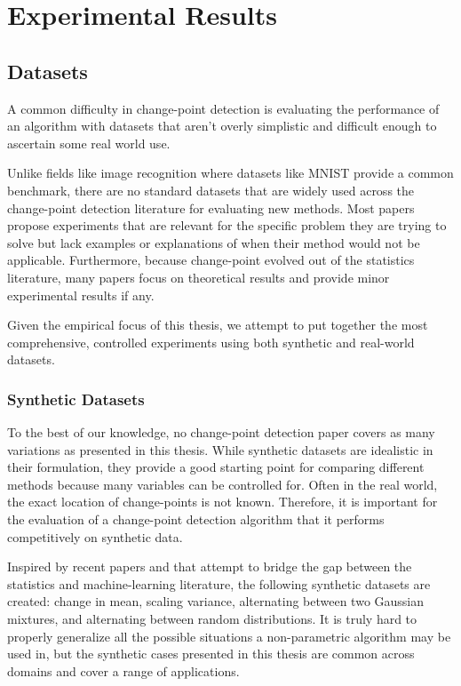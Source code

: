 \chapter{Experimental Results}
\section{Datasets}
A common difficulty in change-point detection is evaluating the performance of an algorithm with datasets that aren't overly simplistic and difficult enough to ascertain some real world use.

Unlike fields like image recognition where datasets like MNIST provide a common benchmark, there are no standard datasets that are widely used across the change-point detection literature for evaluating new methods. Most papers propose experiments that are relevant for the specific problem they are trying to solve  but lack examples or explanations of when their method would not be applicable.  Furthermore, because change-point evolved out of the statistics literature, many papers focus on theoretical results and provide minor experimental results if any.

Given the empirical focus of this thesis, we attempt to put together the most comprehensive, controlled experiments using both synthetic and real-world datasets.
\subsection{Synthetic Datasets}
To the best of our knowledge, no change-point detection paper covers as many variations as presented in this thesis. While synthetic datasets are idealistic in their formulation, they provide a good starting point for comparing different methods because many variables can be controlled for. Often in the real world, the exact location of change-points is not known. Therefore, it is important for the evaluation of a change-point detection algorithm that it performs competitively on synthetic data.

Inspired by recent papers \cite{chang2019kernel} and \cite{flynn2019change} that attempt to bridge the gap between the statistics and machine-learning literature, the following synthetic datasets are created: change in mean, scaling variance, alternating between two Gaussian mixtures, and alternating between random distributions. It is truly hard to properly generalize all the possible situations a non-parametric algorithm may be used in, but the synthetic cases presented in this thesis are common across domains and cover a range of applications.

